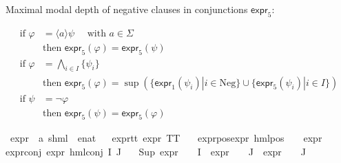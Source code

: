 \begin{isabellebody}
\begin{isamarkuptext}%
Maximal modal depth of negative clauses in conjunctions $\textsf{expr}_5$:

\begin{align*}
    \text{if } \varphi &= \langle a \rangle \psi \quad \text{ with } a \in \Sigma \\
    & \text{then } \textsf{expr}_5(\varphi) = \textsf{expr}_5(\psi) \\
    \text{if } \varphi &= \bigwedge_{i \in I} \{ \psi_i \} \\
    & \text{then } \textsf{expr}_5(\varphi) = \sup(\{\textsf{expr}_1(\psi_i)| i \in \text{Neg}\}\cup \{\textsf{expr}_5(\psi_i)|i \in I\}) \\
    \text{if } \psi &= \neg \varphi \\
    & \text{then } \textsf{expr}_5(\psi) = \textsf{expr}_5(\varphi)
\end{align*}%
\end{isamarkuptext}\isamarkuptrue%
\isamarkupfalse%
\ expr{\isacharunderscore}{\kern0pt}{}\ {\isacharcolon}{\kern0pt}{\isacharcolon}{\kern0pt}\ {\isachardoublequoteopen}{\isacharparenleft}{\kern0pt}{\isacharprime}{\kern0pt}a{\isacharcomma}{\kern0pt}\ {\isacharprime}{\kern0pt}s{\isacharparenright}{\kern0pt}hml\ {\isasymRightarrow}\ enat{\isachardoublequoteclose}\isanewline
\ \ \isanewline
expr{\isacharunderscore}{\kern0pt}{}{\isacharunderscore}{\kern0pt}tt{\isacharcolon}{\kern0pt}\ {\isacartoucheopen}expr{\isacharunderscore}{\kern0pt}{}\ TT\ {\isacharequal}{\kern0pt}\ {}{\isacartoucheclose}\ {\isacharbar}{\kern0pt}\isanewline
expr{\isacharunderscore}{\kern0pt}{}{\isacharunderscore}{\kern0pt}pos{\isacharcolon}{\kern0pt}{\isacartoucheopen}expr{\isacharunderscore}{\kern0pt}{}\ {\isacharparenleft}{\kern0pt}hml{\isacharunderscore}{\kern0pt}pos\ {\isasymalpha}\ {\isasymphi}{\isacharparenright}{\kern0pt}\ {\isacharequal}{\kern0pt}\ expr{\isacharunderscore}{\kern0pt}{}\ {\isasymphi}{\isacartoucheclose}{\isacharbar}{\kern0pt}\isanewline
expr{\isacharunderscore}{\kern0pt}{}{\isacharunderscore}{\kern0pt}conj{\isacharcolon}{\kern0pt}\ {\isacartoucheopen}expr{\isacharunderscore}{\kern0pt}{}\ {\isacharparenleft}{\kern0pt}hml{\isacharunderscore}{\kern0pt}conj\ I\ J\ {\isasymPhi}{\isacharparenright}{\kern0pt}\ {\isacharequal}{\kern0pt}\ \isanewline
{\isacharparenleft}{\kern0pt}Sup\ {\isacharparenleft}{\kern0pt}{\isacharparenleft}{\kern0pt}expr{\isacharunderscore}{\kern0pt}{}\ {\isasymcirc}\ {\isasymPhi}{\isacharparenright}{\kern0pt}\ {\isacharbackquote}{\kern0pt}\ I\ {\isasymunion}\ {\isacharparenleft}{\kern0pt}expr{\isacharunderscore}{\kern0pt}{}\ {\isasymcirc}\ {\isasymPhi}{\isacharparenright}{\kern0pt}\ {\isacharbackquote}{\kern0pt}\ J\ {\isasymunion}\ {\isacharparenleft}{\kern0pt}expr{\isacharunderscore}{\kern0pt}{}\ {\isasymcirc}\ {\isasymPhi}{\isacharparenright}{\kern0pt}\ {\isacharbackquote}{\kern0pt}\ J{\isacharparenright}{\kern0pt}{\isacharparenright}{\kern0pt}{\isacartoucheclose}%

\end{isabellebody}
